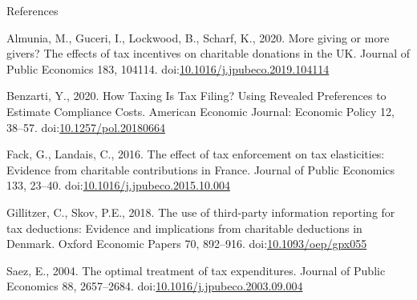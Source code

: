 \documentclass[
  ignorenonframetext,
  aspectratio=169,
]{beamer}
\newlength{\cslhangindent}
\newlength{\cslentryspacingunit} %
\newenvironment{CSLReferences}[2] %
 {%
  \setlength{\parindent}{0pt}
  \ifodd #1
  \let\oldpar\par
  \def\par{\hangindent=\cslhangindent\oldpar}
  \fi
  \setlength{\parskip}{#2\cslentryspacingunit}
 }%
 {}
\begin{document}
\begin{frame}{References}
\hypertarget{refs}{}
\begin{CSLReferences}{1}{0}
\leavevmode{}%
Almunia, M., Guceri, I., Lockwood, B., Scharf, K., 2020. More giving or more givers? {The} effects of tax incentives on charitable donations in the {UK}. Journal of Public Economics 183, 104114. doi:\href{https://doi.org/10.1016/j.jpubeco.2019.104114}{10.1016/j.jpubeco.2019.104114}

\leavevmode{}%
Benzarti, Y., 2020. How {Taxing Is Tax Filing}? {Using Revealed Preferences} to {Estimate Compliance Costs}. American Economic Journal: Economic Policy 12, 38--57. doi:\href{https://doi.org/10.1257/pol.20180664}{10.1257/pol.20180664}

\leavevmode{}%
Fack, G., Landais, C., 2016. The effect of tax enforcement on tax elasticities: {Evidence} from charitable contributions in {France}. Journal of Public Economics 133, 23--40. doi:\href{https://doi.org/10.1016/j.jpubeco.2015.10.004}{10.1016/j.jpubeco.2015.10.004}

\leavevmode{}%
Gillitzer, C., Skov, P.E., 2018. The use of third-party information reporting for tax deductions: Evidence and implications from charitable deductions in {Denmark}. Oxford Economic Papers 70, 892--916. doi:\href{https://doi.org/10.1093/oep/gpx055}{10.1093/oep/gpx055}

\leavevmode{}%
Saez, E., 2004. The optimal treatment of tax expenditures. Journal of Public Economics 88, 2657--2684. doi:\href{https://doi.org/10.1016/j.jpubeco.2003.09.004}{10.1016/j.jpubeco.2003.09.004}

\end{CSLReferences}
\end{frame}
\end{document}

